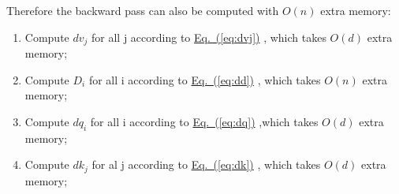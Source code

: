 \documentclass{article}
\newcommand{\redbox}[1]{%
  \colorbox{red!20}{\hyperref[#1]{Eq.~(\ref*{#1})}}%
}
\begin{document}
Therefore the backward pass can also be computed with $O(n)$ extra memory:
\begin{enumerate}
    \item Compute $dv_j$ for all j according to \redbox{eq:dvj}, which takes $O(d)$ extra memory;
    \item Compute $D_i$ for all i according to \redbox{eq:dd}, which takes $O(n)$ extra memory;
    \item Compute $dq_i$ for all i according to \redbox{eq:dq},which takes $O(d)$ extra memory;
    \item Compute $dk_j$ for al j according to \redbox{eq:dk}, which takes $O(d)$ extra memory;
\end{enumerate}
\end{document}
